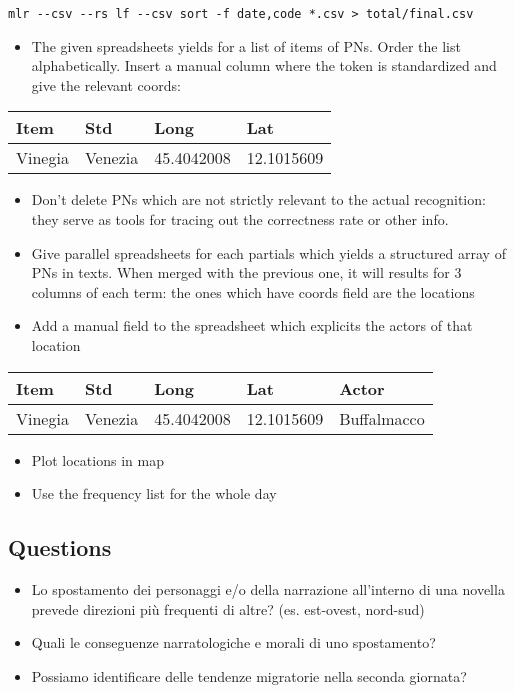 \begin{verbatim}
mlr --csv --rs lf --csv sort -f date,code *.csv > total/final.csv
\end{verbatim}

\begin{itemize}
\tightlist
\item
  The given spreadsheets yields for a list of items of PNs. Order the
  list alphabetically. Insert a manual column where the token is
  standardized and give the relevant coords:
\end{itemize}

\begin{longtable}[]{@{}llll@{}}
\toprule
Item & Std & Long & Lat\tabularnewline
\midrule
\endhead
Vinegia & Venezia & 45.4042008 & 12.1015609\tabularnewline
\bottomrule
\end{longtable}

\begin{itemize}
\tightlist
\item
  Don't delete PNs which are not strictly relevant to the actual
  recognition: they serve as tools for tracing out the correctness rate
  or other info.
\item
  Give parallel spreadsheets for each partials which yields a structured
  array of PNs in texts. When merged with the previous one, it will
  results for 3 columns of each term: the ones which have coords field
  are the locations
\item
  Add a manual field to the spreadsheet which explicits the actors of
  that location
\end{itemize}

\begin{longtable}[]{@{}lllll@{}}
\toprule
Item & Std & Long & Lat & Actor\tabularnewline
\midrule
\endhead
Vinegia & Venezia & 45.4042008 & 12.1015609 & Buffalmacco\tabularnewline
\bottomrule
\end{longtable}

\begin{itemize}
\tightlist
\item
  Plot locations in map
\item
  Use the frequency list for the whole day
\end{itemize}

\subsection{Questions}\label{questions}

\begin{itemize}
\tightlist
\item
  Lo spostamento dei personaggi e/o della narrazione all'interno di una
  novella prevede direzioni più frequenti di altre? (es. est-ovest,
  nord-sud)
\item
  Quali le conseguenze narratologiche e morali di uno spostamento?
\item
  Possiamo identificare delle tendenze migratorie nella seconda
  giornata?
\end{itemize}


